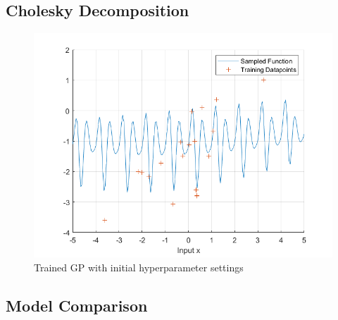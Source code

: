 \documentclass[]{article}
\newcommand{\figwidth}{0.6\linewidth}
\begin{document}
\subsection{Cholesky Decomposition}

\begin{figure}[!h]
	\centering
	\includegraphics[width=\figwidth]{1d}
	\caption{Trained GP with initial hyperparameter settings}
	\label{fig:1d}
\end{figure}

\subsection{Model Comparison}
\end{document}
